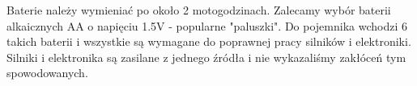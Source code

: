 \documentclass[a4paper,11pt]{article}
\begin{document}
Baterie należy wymieniać po około 2 motogodzinach. Zalecamy wybór baterii alkaicznych AA o napięciu 1.5V - popularne "paluszki". Do pojemnika wchodzi 6 takich baterii i wszystkie są wymagane do poprawnej pracy silników i elektroniki. Silniki i elektronika są zasilane z jednego źródła i nie wykazaliśmy zakłóceń tym spowodowanych.
\end{document}
